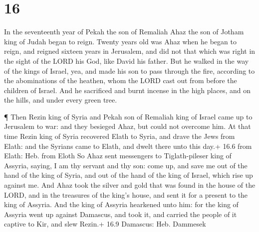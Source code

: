 \hypertarget{section-15}{%
\section{16}\label{section-15}}

 In the seventeenth year of Pekah the son of Remaliah Ahaz
the son of Jotham king of Judah began to reign.  Twenty
years old was Ahaz when he began to reign, and reigned sixteen years in
Jerusalem, and did not that which was right in the sight of the LORD his
God, like David his father.  But he walked in the way of the
kings of Israel, yea, and made his son to pass through the fire,
according to the abominations of the heathen, whom the LORD cast out
from before the children of Israel.  And he sacrificed and
burnt incense in the high places, and on the hills, and under every
green tree.

 ¶ Then Rezin king of Syria and Pekah son of Remaliah king
of Israel came up to Jerusalem to war: and they besieged Ahaz, but could
not overcome him.  At that time Rezin king of Syria
recovered Elath to Syria, and drave the Jews from Elath: and the Syrians
came to Elath, and dwelt there unto this day.+ 16.6 from Elath: Heb.
from Eloth  So Ahaz sent messengers to Tiglath-pileser king
of Assyria, saying, I am thy servant and thy son: come up, and save me
out of the hand of the king of Syria, and out of the hand of the king of
Israel, which rise up against me.  And Ahaz took the silver
and gold that was found in the house of the LORD, and in the treasures
of the king's house, and sent it for a present to the king of Assyria.
 And the king of Assyria hearkened unto him: for the king of
Assyria went up against Damascus, and took it, and carried the people of
it captive to Kir, and slew Rezin.+ 16.9 Damascus: Heb. Dammesek

